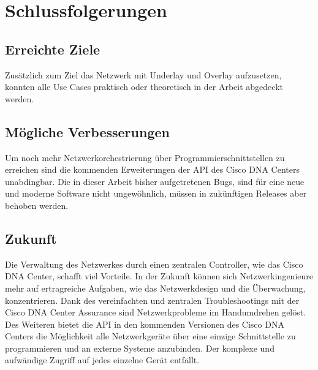 \section{Schlussfolgerungen}

\subsection{Erreichte Ziele}
Zusätzlich zum Ziel das Netzwerk mit Underlay und Overlay aufzusetzen, konnten alle Use Cases praktisch oder theoretisch in der Arbeit abgedeckt werden. 
\subsection{Mögliche Verbesserungen}
Um noch mehr Netzwerkorchestrierung über Programmierschnittstellen zu erreichen sind die kommenden Erweiterungen der API des Cisco DNA Centers unabdingbar. Die in dieser Arbeit bisher aufgetretenen Bugs, sind für eine neue und moderne Software nicht ungewöhnlich, müssen in zukünftigen Releases aber behoben werden.
 
\subsection{Zukunft}
Die Verwaltung des Netzwerkes durch einen zentralen Controller, wie das Cisco DNA Center, schafft viel Vorteile. In der Zukunft können sich Netzwerkingenieure mehr auf ertragreiche Aufgaben, wie das Netzwerkdesign und die Überwachung, konzentrieren. Dank des vereinfachten und zentralen Troubleshootings mit der Cisco DNA Center Assurance sind Netzwerkprobleme im Handumdrehen gelöst. Des Weiteren bietet die API in den kommenden Versionen des Cisco DNA Centers die Möglichkeit alle Netzwerkgeräte über eine einzige Schnittstelle zu programmieren und an externe Systeme anzubinden. Der komplexe und aufwändige Zugriff auf jedes einzelne Gerät entfällt. 